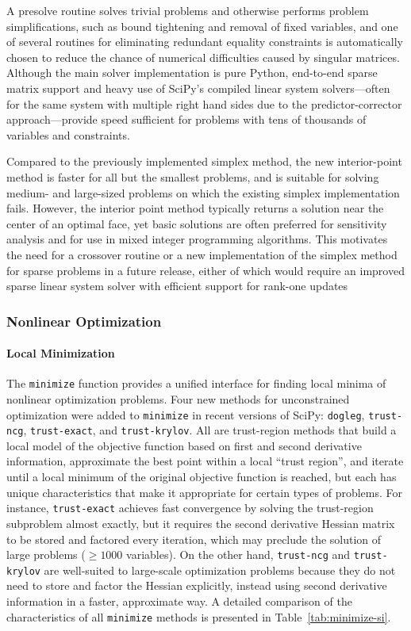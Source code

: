 A presolve routine \cite{andersen1995presolving} solves trivial problems and otherwise performs problem simplifications, such as bound tightening and removal of fixed variables, and one of several routines for eliminating redundant equality constraints is automatically chosen to reduce the chance of numerical difficulties caused by singular matrices. Although the main solver implementation is pure Python, end-to-end sparse matrix support and heavy use of SciPy's compiled linear system solvers---often for the same system with multiple right hand sides due to the predictor-corrector approach---provide speed sufficient for problems with tens of thousands of variables and constraints.

Compared to the previously implemented simplex method, the new interior-point method is faster for all but the smallest problems, and is suitable for solving medium- and large-sized problems on which the existing simplex implementation fails. However, the interior point method typically returns a solution near the center of an optimal face, yet basic solutions are often preferred for sensitivity analysis and for use in mixed integer programming algorithms. This motivates the need for a crossover routine or a new implementation of the simplex method for sparse problems in a future release, either of which would require an improved sparse linear system solver with efficient support for rank-one updates

\subsubsection*{Nonlinear Optimization}
\paragraph{Local Minimization}
The \texttt{minimize} function provides a unified interface for finding local minima of nonlinear optimization problems. Four new methods for unconstrained optimization were added to \texttt{minimize} in recent versions of SciPy: \texttt{dogleg}, \texttt{trust-ncg}, \texttt{trust-exact}, and \texttt{trust-krylov}. All are trust-region methods that build a local model of the objective function based on first and second derivative information, approximate the best point within a local ``trust region'', and iterate until a local minimum of the original objective function is reached, but each has unique characteristics that make it appropriate for certain types of problems. For instance, \texttt{trust-exact} achieves fast convergence by solving the trust-region subproblem almost exactly, but it requires the second derivative Hessian matrix to be stored and factored every iteration, which may preclude the solution of large problems ($\geq 1000$ variables). On the other hand, \texttt{trust-ncg} and \texttt{trust-krylov} are well-suited to large-scale optimization problems because they do not need to store and factor the Hessian explicitly, instead using second derivative information in a faster, approximate way. A detailed comparison of the characteristics of all \texttt{minimize} methods is presented in Table~\ref{tab:minimize-si}.

